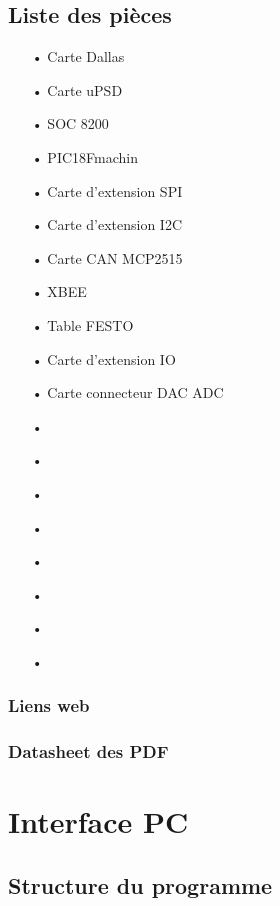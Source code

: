 \documentclass[10pt,a4paper,final]{article}
\begin{document}
\begin{spacing}{1.5}
\subsection{Liste des pièces}
\begin{center}
\HRule
\end{center}
\begin{multicols}{3}
\begin{itemize}
\item[•]Carte Dallas
\item[•]Carte uPSD
\item[•]SOC 8200
\item[•]PIC18Fmachin
\item[•]Carte d'extension SPI
\item[•]Carte d'extension I2C
\item[•]Carte CAN MCP2515
\item[•]XBEE
\item[•]Table FESTO
\item[•]Carte d'extension IO
\item[•]Carte connecteur DAC ADC
\item[•]
\item[•]
\item[•]
\item[•]
\item[•]
\item[•]
\item[•]
\item[•]
\end{itemize}
\end{multicols}
\begin{center}
\HRule
\end{center}


\subsubsection{Liens web}

\subsubsection{Datasheet des PDF}


\pagebreak
\section{Interface PC}

\subsection{Structure du programme}


\end{spacing}
\end{document}
